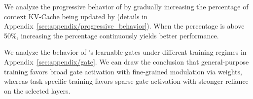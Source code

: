  We analyze the progressive behavior of \name by gradually increasing the percentage of context KV-Cache being updated by \name (details in Appendix~\ref{sec:appendix/progressive_behavior}).
When the percentage is above 50\%, increasing the percentage continuously yields better performance.

 We analyze the behavior of \name’s learnable gates under different training regimes in Appendix~\ref{sec:appendix/gate}. We can draw the conclusion that general-purpose training favors broad gate activation with fine-grained modulation via weights, whereas task-specific
training favors sparse gate activation with stronger reliance on the selected layers.

